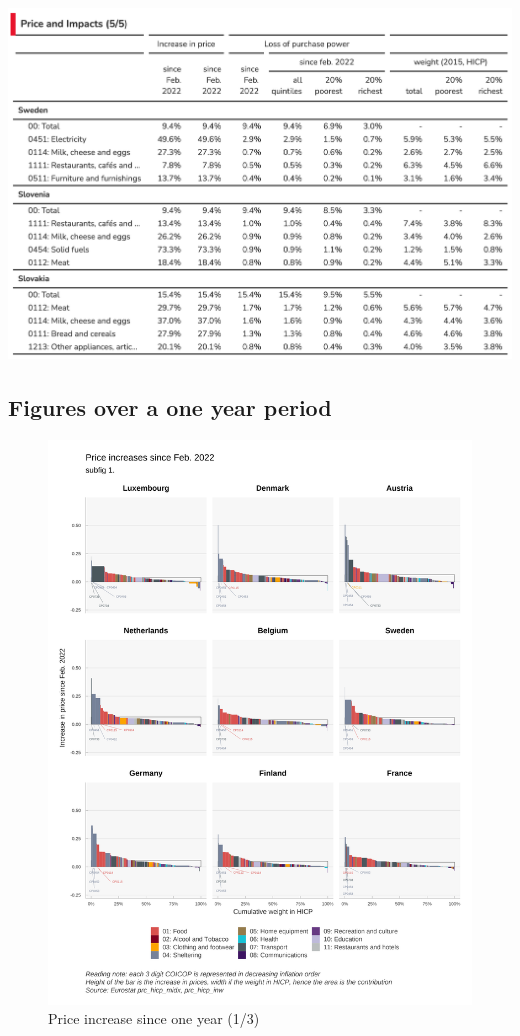 \documentclass[
  9pt,
  a4paper,
  numbers=noendperiod,
  DIV=12]{scrartcl}
\begin{document}
\includegraphics{svg/annex_5.png}

\newpage

\hypertarget{figures-over-a-one-year-period}{%
\subsection{Figures over a one year
period}\label{figures-over-a-one-year-period}}

\begin{figure}

\caption{Price increase since one year (1/3)}

{\centering \includegraphics{svg/depuis_1y_1.png}

}

\end{figure}
\end{document}
